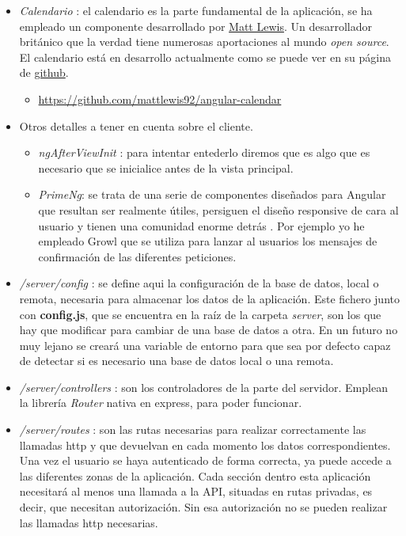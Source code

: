 \begin{itemize}
\item \emph{Calendario} : el calendario es la parte fundamental de la aplicación, se ha empleado un componente desarrollado por \href{https://mattlewis.me/}{Matt Lewis}. Un desarrollador británico que la verdad tiene numerosas aportaciones al mundo \emph{open source}. El calendario está en desarrollo actualmente como se puede ver en su página de \href{https://github.com/mattlewis92/angular-calendar}{github}. 
\begin{itemize}
\item \url{https://github.com/mattlewis92/angular-calendar}
\end{itemize}



\item Otros detalles a tener en cuenta sobre el cliente.
\begin{itemize}
	\item \emph{ngAfterViewInit} \cite{afterview} : para intentar entederlo diremos que es algo que es necesario que se inicialice antes de la vista principal. 
	\item \emph{PrimeNg}: se trata de una serie de componentes diseñados para Angular que resultan ser realmente útiles, persiguen el diseño responsive de cara al usuario y tienen una comunidad enorme detrás \cite{prime}. Por ejemplo yo he empleado Growl \cite{growl} que se utiliza para lanzar al usuarios los mensajes de confirmación de las diferentes peticiones.  
\end{itemize}

\item\emph{/server/config} : se define aqui la configuración de la base de datos, local o remota, necesaria para almacenar los datos de la aplicación. Este fichero junto con \textbf{config.js}, que se encuentra en la raíz de la carpeta \emph{server}, son los que hay que modificar para cambiar de una base de datos a otra. En un futuro no muy lejano se creará una variable de entorno para que sea por defecto capaz de detectar si es necesario una base de datos local o una remota. 

\item\emph{/server/controllers} : son los controladores de la parte del servidor. Emplean la librería  \emph{Router} \cite{router} nativa en express, para poder funcionar.


\item\emph{/server/routes} : son las rutas necesarias para realizar correctamente las llamadas http  y que devuelvan en cada momento los datos correspondientes. Una vez el usuario se haya autenticado de forma correcta, ya puede accede a las diferentes zonas de la aplicación. Cada sección dentro esta aplicación necesitará al menos una llamada a la API, situadas en rutas privadas, es decir, que necesitan autorización. Sin esa autorización no se pueden realizar las llamadas http necesarias. 


\end{itemize}
